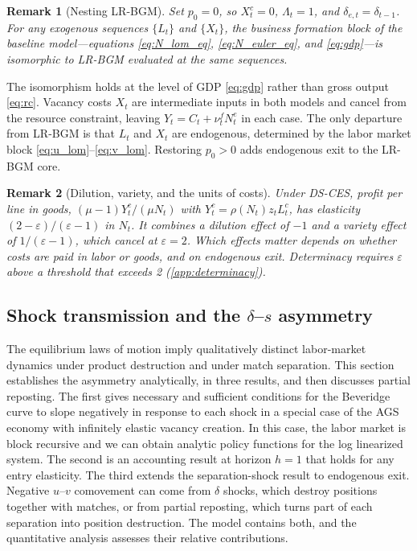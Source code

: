 \documentclass[authoryear, review, 12pt]{elsarticle}
\newtheorem{remark}{Remark}
\begin{document}
\begin{remark}[Nesting LR-BGM]
	\label{rem:bgm_nest}
	Set $p_0=0$, so $X_t^c=0$, $\Lambda_t=1$, and
	$\delta_{e,t}=\delta_{t-1}$.  For any exogenous
	sequences $\{L_t\}$ and $\{X_t\}$, the business
	formation block of the baseline model---equations
	\eqref{eq:N_lom_eq}, \eqref{eq:N_euler_eq}, and
	\eqref{eq:gdp}---is isomorphic to LR-BGM evaluated
	at the same sequences.
\end{remark}

The isomorphism holds at the level of GDP \eqref{eq:gdp} rather than gross output
\eqref{eq:rc}. Vacancy costs $X_t$ are intermediate inputs in both models and cancel from
the resource constraint, leaving $Y_t = C_t + \nu_t^f N_t^e$ in each case. The only
departure from LR-BGM is that $L_t$ and $X_t$ are endogenous, determined by the labor
market block \eqref{eq:u_lom}--\eqref{eq:v_lom}. Restoring $p_0>0$ adds endogenous exit to
the LR-BGM core.

\begin{remark}[Dilution, variety, and the units of costs]\label{rem:dilution_variety}
	Under DS-CES, profit per line in goods, $(\mu-1)Y_t^c/(\mu N_t)$ with
	$Y_t^c=\rho(N_t)z_tL_t^c$, has elasticity $(2-\varepsilon)/(\varepsilon-1)$ in $N_t$. It
	combines a dilution effect of $-1$ and a variety effect of $1/(\varepsilon-1)$, which
	cancel at $\varepsilon=2$. Which effects matter depends on whether costs are paid in labor
	or goods, and on endogenous exit. Determinacy requires $\varepsilon$ above a threshold
	that exceeds 2 (\ref{app:determinacy}).
\end{remark}

\subsection{Shock transmission and the \texorpdfstring{$\delta$--$s$}{delta-s} asymmetry}\label{sec:mechanism}

The equilibrium laws of motion imply qualitatively distinct labor-market dynamics under
product destruction and under match separation. This section establishes the asymmetry
analytically, in three results, and then discusses partial reposting. The first gives necessary and sufficient conditions for the Beveridge curve to slope negatively in response to each shock in a special case of the AGS economy with
infinitely elastic vacancy creation. In this case, the labor market is block recursive and we can obtain analytic policy functions for the log linearized system. The second is an accounting result at horizon $h=1$ that holds for any entry
elasticity. The third extends the separation-shock result to endogenous exit. Negative
$u$--$v$ comovement can come from $\delta$ shocks, which destroy positions together with
matches, or from partial reposting, which turns part of each separation into position
destruction. The model contains both, and the quantitative analysis assesses their
relative contributions.
\end{document}
